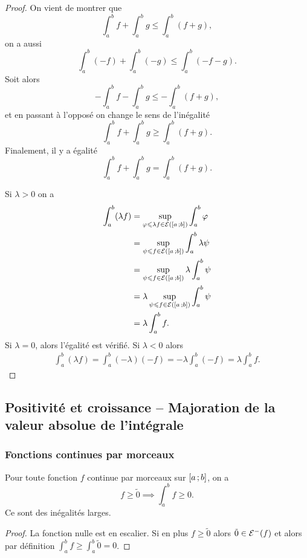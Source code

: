 \begin{proof}
On vient de montrer que
\begin{equation}
  \int_a^b f + \int_a^b g \leqslant \int_a^b (f+g),
\end{equation}
on a aussi
\begin{equation}
  \int_a^b (-f) + \int_a^b (-g) \leqslant \int_a^b (-f-g).
\end{equation}
Soit alors
\begin{equation}
  -\int_a^b f - \int_a^b g \leqslant -\int_a^b (f+g),
\end{equation}
et en passant à l'opposé on change le sens de l'inégalité
\begin{equation}
  \int_a^b f + \int_a^b g \geqslant \int_a^b (f+g).
\end{equation}
Finalement, il y a égalité 
\begin{equation}
  \int_a^b f + \int_a^b g = \int_a^b (f+g).
\end{equation}

Si $\lambda>0$ on a
\begin{align}
  \int_a^b (\lambda f) &= \sup\limits_{\varphi \leqslant \lambda f \in \mathcal{E}(\left[ a \, ;  b \right])} \int_a^b \varphi \\
  &= \sup\limits_{\psi \leqslant f \in \mathcal{E}(\left[ a \, ;  b \right])} \int_a^b \lambda \psi \\
  &= \sup\limits_{\psi \leqslant f \in \mathcal{E}(\left[ a \, ;  b \right])} \lambda \int_a^b \psi \\
  &= \lambda \sup\limits_{\psi \leqslant f \in \mathcal{E}(\left[ a \, ;  b \right])} \int_a^b \psi \\
  &=\lambda \int_a^b f.
\end{align}
Si $\lambda=0$, alors l'égalité est vérifié. Si $\lambda<0$ alors
\begin{align}
  \int_a^b (\lambda f) = \int_a^b (-\lambda)(-f) = -\lambda \int_a^b(-f) = \lambda \int_a^b f.
\end{align}
\end{proof}

\subsection{Positivité et croissance -- Majoration de la valeur absolue de l'intégrale}

\subsubsection{Fonctions continues par morceaux}

\begin{theo}
  Pour toute fonction $f$ continue par morceaux sur $\left[ a \, ;  b \right]$, on a
  \begin{equation}
    f \geqslant \tilde{0} \implies \int_a^b f \geqslant 0.
  \end{equation}
  \danger Ce sont des inégalités larges.
\end{theo}
\begin{proof}
  La fonction nulle est en escalier. Si en plus $f \geqslant \tilde{0}$ alors $\tilde{0} \in \mathcal{E}^{-}(f)$ et alors par définition $\int_a^b f \geqslant \int_a^b \tilde{0}=0$.
\end{proof}

